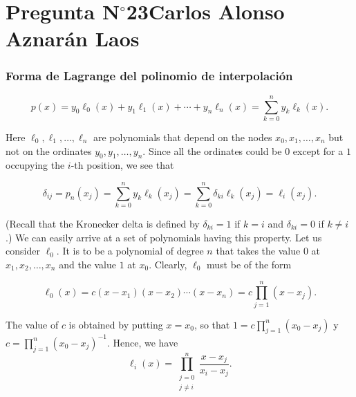 \section{Pregunta N$^{\circ}$23\qquad Carlos Alonso Aznarán Laos}

\begin{frame}
	\frametitle{Forma de Lagrange del polinomio de interpolación}

	\begin{equation*}
		p\left(x\right)=
		y_{0}\ell_{0}\left(x\right)+
		y_{1}\ell_{1}\left(x\right)+
		\cdots+
		y_{n}\ell_{n}\left(x\right)=
		\sum\limits_{k=0}^{n}
		y_{k}\ell_{k}\left(x\right).
	\end{equation*}

	Here $\ell_{0},\ell_{1},\ldots,\ell_{n}$ are polynomials that
	depend on the nodes $x_0, x_1, \ldots, x_n$ but not on the
	ordinates $y_{0},y_{1},\ldots,y_{n}$.
	Since all the ordinates could be $0$ except for a $1$ occupying the
	$i$-th position, we see that

	\begin{equation*}
		\delta_{ij}=
		p_{n}\left(x_j\right)=
		\sum_{k=0}^{n}y_{k}\ell_k\left(x_j\right)=
		\sum_{k=0}^{n}\delta_{ki}\ell_{k}\left(x_j\right)=
		\ell_i\left(x_j\right).
	\end{equation*}

	(Recall that the Kronecker delta is defined by $\delta_{k i}=1$ if
	$k=i$ and $\delta_{k i}=0$ if $k \neq i$.)
	We can easily arrive at a set of polynomials having this property.
	Let us consider $\ell_{0}$.
	It is to be a polynomial of degree $n$ that takes the value $0$ at
	$x_{1},x_{2},\ldots,x_{n}$ and the value $1$ at $x_0$.
	Clearly, $\ell_{0}$ must be of the form

	\begin{equation*}
		\ell_{0}\left(x\right)=
		c\left(x-x_1\right)
		\left(x-x_2\right)\cdots
		\left(x-x_n\right)=
		c\prod_{j=1}^{n}
		\left(x-x_j\right).
	\end{equation*}

	The value of $c$ is obtained by putting $x=x_{0}$, so that
	\begin{math}
		1=
		c\prod\limits_{j=1}^{n}
		\left(x_{0}-x_{j}\right)
	\end{math}
	y
	\begin{math}
		c=
		\prod\limits_{j=1}^{n}
		{\left(x_{0}-x_{j}\right)}^{-1}
	\end{math}.
	Hence, we have
	\begin{equation*}
		\ell_{i}\left(x\right)=
		\prod_{\substack{j=0\\j\neq i}}^{n}
		\frac{x-x_{j}}{x_{i}-x_{j}}.
	\end{equation*}
\end{frame}

